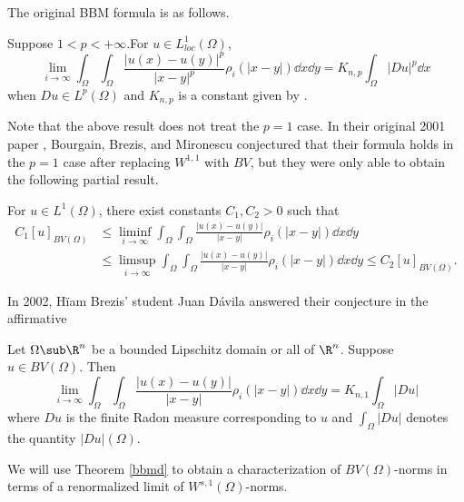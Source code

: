\documentclass[../main.tex]{subfiles}
\begin{document}
The original BBM formula is as follows. 
\begin{theorem}\label{bbm}
    Suppose $ 1< p <+\infty $.For $ u\in L^{1}_{loc}(\Omega) $,
    \[
        \lim_{i\to\infty} \int_{\Omega}\int_{\Omega} \frac{|u(x)-u(y)|^{p}}{|x-y|^{p}} \rho_{i}(|x-y|)\dd{x} \dd{y} = K_{n,p}\int_{\Omega}| Du|^{p} \dd{x}
    \]
    when $ Du\in L^{p}(\Omega) $ and $ K_{n,p} $ is a constant given by . 
\end{theorem}
Note that the above result does not treat the $ p=1 $ case. In their original 2001 paper \cite{brezis:2001}, Bourgain, Brezis, and Mironescu conjectured that their formula holds in the $ p=1 $ case after replacing $ W^{1,1} $ with $ BV $, but they were only able to obtain the following partial result.
\begin{theorem}
    For $ u\in L^1(\Omega) $, there exist constants $ C_{1}, C_{2}>0  $ such that 
    \begin{align*}
        C_{1} [u]_{BV(\Omega)} &\leq  \liminf_{i\to\infty} \int_{\Omega}\int_{\Omega} \frac{|u(x)-u(y)|}{|x-y|} \rho_{i}(|x-y|)\dd{x} \dd{y} \\
        &\leq \limsup_{i\to\infty} \int_{\Omega}\int_{\Omega} \frac{|u(x)-u(y)|}{|x-y|} \rho_{i}(|x-y|)\dd{x} \dd{y} \leq C_{2}[u]_{BV(\Omega)}.
    \end{align*}
\end{theorem}
In 2002, H\"iam Brezis' student Juan D\'avila \cite{davila:2002} answered their conjecture in the affirmative 

\begin{theorem}\label{bbmd}
    Let $ \Omega\sub \R^{n} $ be a bounded Lipschitz domain or all of $ \R^{n} $. Suppose $ u\in BV(\Omega) $. Then
    \[
        \lim_{i\to\infty} \int_{\Omega}\int_{\Omega} \frac{|u(x)-u(y)|}{|x-y|} \rho_{i}(|x-y|)\dd{x} \dd{y} = K_{n,1}\int_{\Omega}| Du|
    \]
    where $ Du $ is the finite Radon measure corresponding to $ u $ and $ \int_{\Omega} |Du| $ denotes the quantity $ |Du |(\Omega) $.
\end{theorem}

We will use Theorem \ref{bbmd} to obtain a characterization of $ BV(\Omega) $-norms in terms of a renormalized limit of $ W^{s,1}(\Omega) $-norms.
\end{document}
